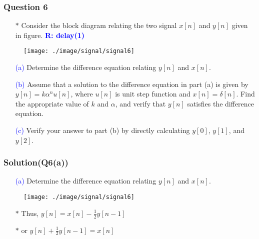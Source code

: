 \documentclass{beamer}
\newcommand{\blue}[1]{\textcolor{blue}{#1}}
\begin{document}
\begin{frame}
\frametitle{Question 6}

\begin{itemize} \itemsep1pt \parskip0pt 
  \item[$\ast$] Consider the block diagram relating the two signal $x[n]$ and $y[n]$ given in figure. \blue{\bf R: delay(1)}
\end{itemize}


\begin{figure}[H]
  \centering
  \texttt{[image: ./image/signal/signal6]}
\end{figure}



\begin{itemize} \itemsep1pt \parskip0pt 
  \item[\blue{(a)}] Determine the difference equation relating $y[n]$ and $x[n]$.
  \item[\blue{(b)}] Assume that a solution to the difference equation in part (a) is given by $y[n] = k\alpha^nu[n]$, where $u[n]$ is unit step function and $x[n] = \delta[n]$. Find the appropriate value of $k$ and $\alpha$, and verify that $y[n]$ satisfies the difference equation.
  \item[\blue{(c)}] Verify your answer to part (b) by directly calculating $y[0]$, $y[1]$, and $y[2]$.
\end{itemize}

\end{frame}

\begin{frame}
\frametitle{Solution(Q6(a))}

\begin{itemize} \itemsep1pt \parskip0pt 
  \item[\blue{(a)}] Determine the difference equation relating $y[n]$ and $x[n]$.
\end{itemize}


\begin{figure}[H]
  \centering
  \texttt{[image: ./image/signal/signal6]}
\end{figure}

\begin{itemize} \itemsep1pt \parskip0pt 
  \item[$\ast$] Thus, $y[n]=x[n]-\frac{1}{2}y[n-1]$
  \item[$\ast$] or $y[n]+\frac{1}{2}y[n-1]=x[n]$
\end{itemize}


\end{frame}
\end{document}
